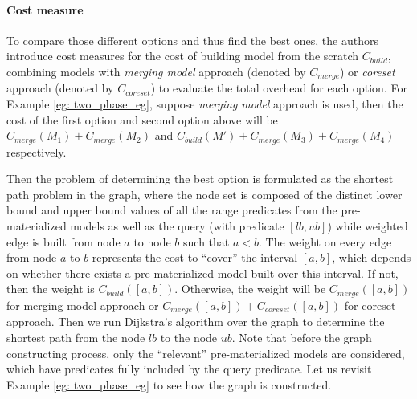 \paragraph{Cost measure} To compare those different options and thus find the best ones, the authors introduce cost measures for the cost of building model from the scratch $C_{build}$, combining models with {\em merging model} approach (denoted by $C_{merge}$) or {\em coreset} approach (denoted by $C_{coreset}$) to evaluate the total overhead for each option. For Example \ref{eg: two_phase_eg}, suppose {\em merging model} approach is used, then the cost of the first option and second option above will be $C_{merge}(M_1) + C_{merge}(M_2)$ and $C_{build}(M') + C_{merge}(M_3) + C_{merge}(M_4)$ respectively. 

Then the problem of determining the best option is formulated as the shortest path problem in the graph, where the node set is composed of the distinct lower bound and upper bound values of all the range predicates from the pre-materialized models as well as the query (with predicate $[lb, ub]$) while weighted edge is built from node $a$ to node $b$ such that $a < b$. The weight on every edge from node $a$ to $b$ represents the cost to ``cover'' the interval $[a,b]$, which depends on whether there exists a pre-materialized model built over this interval. If not, then the weight is $C_{build}([a,b])$. Otherwise, the weight will be $C_{merge}([a,b])$ for merging model approach or $C_{merge}([a,b]) + C_{coreset}([a,b])$ for coreset approach. Then we run Dijkstra's algorithm over the graph to determine the shortest path from the node $lb$ to the node $ub$. Note that before the graph constructing process, only the ``relevant'' pre-materialized models are considered, which have predicates fully included by the query predicate. Let us revisit Example \ref{eg: two_phase_eg} to see how the graph is constructed.

